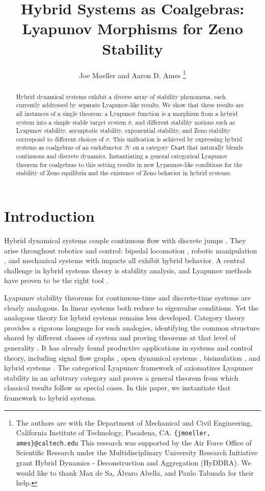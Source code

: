 \documentclass[letterpaper, 10 pt, conference]{IEEEconf}
\title{\LARGE \bf
Hybrid Systems as Coalgebras: Lyapunov Morphisms for Zeno Stability
}
\author{Joe Moeller and Aaron D. Ames%
\thanks{The authors are with the Department of Mechanical and Civil Engineering, California Institute of Technology, Pasadena, CA. 
{\tt\small \{jmoeller, ames\}@caltech.edu}
This research was supported by the Air Force Office of Scientific Research under the Multidisciplinary University Research Initiative grant Hybrid Dynamics ‐ Deconstruction and Aggregation (HyDDRA). We would like to thank Max de Sa, Álvaro Abella, and Paulo Tabuada for their help.
}%
}
\theoremstyle{definition}
\begin{document}
\maketitle
\thispagestyle{empty}
\pagestyle{empty}


\begin{abstract}
    Hybrid dynamical systems exhibit a diverse array of stability phenomena, each currently addressed by separate Lyapunov-like results. We show that these results are all instances of a single theorem: a Lyapunov function is a morphism from a hybrid system into a simple stable target system $\sigma$, and different stability notions such as Lyapunov stability, asymptotic stability, exponential stability, and Zeno stability correspond to different choices of $\sigma$. This unification is achieved by expressing hybrid systems as coalgebras of an endofunctor $\mathcal H$ on a category $\mathsf{Chart}$ that naturally blends continuous and discrete dynamics.  Instantiating a general categorical Lyapunov theorem for coalgebras to this setting results in new Lypaunov-like conditions for the stability of Zeno equilibria and the existence of Zeno behavior in hybrid systems. 
\end{abstract}


\section{Introduction}
\label{sec:intro}

Hybrid dynamical systems couple continuous flow with discrete jumps \cite{alur1991hybrid, LygerosJohanssonSimic2003, SimicGeomHySys}. They arise throughout robotics and control: bipedal locomotion \cite{spong2005controlled, RESCLF}, robotic manipulation \cite{choset2005principles}, and mechanical systems with impacts \cite{NonsmoothMechanics} all exhibit hybrid behavior. A central challenge in hybrid systems theory is stability analysis, and Lyapunov methods have proven to be the right tool \cite{lamperski2012lyapunov, GoebelTeel08, GoebelSanfeliceTeel12}.

Lyapunov stability theorems for continuous-time and discrete-time systems are clearly analogous. In linear systems both reduce to eigenvalue conditions. Yet the analogous theory for hybrid systems remains less developed. Category theory provides a rigorous language for such analogies, identifying the common structure shared by different classes of system and proving theorems at that level of generality \cite{CatsinContext}. It has already found productive applications in systems and control theory, including signal flow graphs \cite{bonchi2014categorical, baez2014categories}, open dynamical systems \cite{tabuada2005quotients, schultz2020dynamical, CategoricalSystemsTheory}, bisimulation \cite{haghverdi2005bisimulation}, and hybrid systems \cite{lerman2020networks}. The categorical Lyapunov framework of \cite{CLT1, CLT2} axiomatizes Lyapunov stability in an arbitrary category and proves a general theorem from which classical results follow as special cases. In this paper, we instantiate that framework to hybrid systems.
\end{document}
